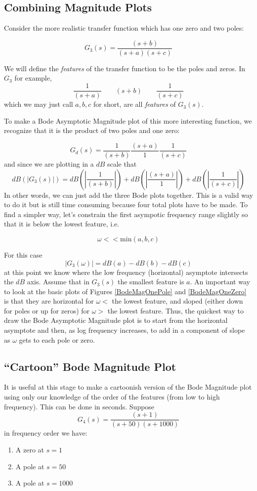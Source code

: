 \subsection{Combining Magnitude Plots}

Consider the more realistic transfer function which has one zero and two poles:

\[
G_3(s) = \frac    {(s+b)} {(s+a)(s+c)}
\]

We will define the {\it features} of the transfer function to be the  poles and zeros.
In $G_3$ for example,
\[
\frac {1} {(s+a)} \qquad {(s+b)} \qquad\frac {1} {(s+c)}
\]
which we may just call $a,b,c$ for short, are all {\it features} of $G_3(s)$.

To make a Bode Asymptotic Magnitude plot of this more interesting function, we recognize that it is the product of two poles and one zero:

\[
G_d(s) = \frac {1} {(s+b)}  \frac {(s+a)} {1}  \frac {1} {(s+c)}
\]
and since we are plotting in a $dB$ scale that
\[
dB(|G_3(s)|) =  dB(\left |\frac {1} {(s+b)}\right |) +   dB(\left |\frac {(s+a)} {1}\right | ) +  dB( \left | \frac {1} {(s+c)}\right |  )
\]
In other words, we can just add the three Bode plots together.   This is a valid way to do it but is still time consuming because four total plots have to be made.   To find a simpler way, let's constrain the first asympotic frequency range slightly so that it is below the lowest feature, i.e.

\[
\omega <<  \mathrm{min}(a,b,c)
\]

For this case
\[
|G_3(\omega)| = dB(a) - dB(b)  - dB(c)
\]
at this point we know where the low frequency (horizontal) asymptote intersects the $dB$ axis.
Assume that in $G_3(s)$ the smallest feature is $a$.
An important way to look at the basic plots of Figures \ref{BodeMagOnePole} and \ref{BodeMagOneZero} is that they are horizontal for $\omega < $ the lowest feature, and sloped (either down for poles or up for zeros) for $\omega > $ the lowest feature.
Thus, the quickest way to draw the Bode Asymptotic Magnitude plot is to start from the horizontal asymptote and then,
as log frequency increases, to add in a component of slope as $\omega$ gets to each pole or zero.


\subsection{``Cartoon'' Bode Magnitude Plot}\label{CartoonBode}
It is useful at this stage to make a cartoonish version of the Bode Magnitude plot using only
our knowledge of the order of the features (from low to high frequency). This can be done in
seconds.  Suppose
\[
G_4(s) = \frac  {(s+1)}  {(s+50)(s+1000)}
\]
in frequency order we have:
\begin{enumerate}
  \item A zero at $s=1$
  \item A pole at $s=50$
  \item A pole at $s=1000$
\end{enumerate}

